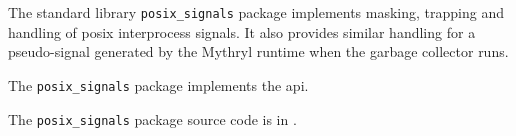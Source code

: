 
The standard library {\tt posix\_signals} package implements 
masking, trapping and handling of posix interprocess signals.  It also provides similar handling 
for a pseudo-signal generated by the Mythryl runtime when the garbage collector 
runs.

The {\tt posix\_signals} package implements the  api.

The {\tt posix\_signals} package source code is in .

